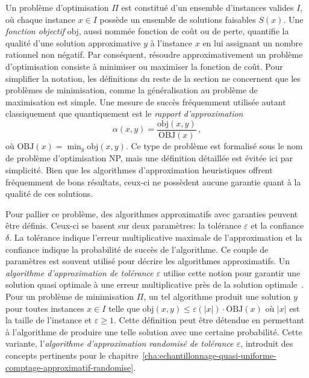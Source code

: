 Un problème d'optimisation $\Pi$ est constitué d'un ensemble d'instances valides $I$, où chaque instance $x \in I$ possède un ensemble de solutions faisables $S(x)$. Une \textit{fonction objectif} $\text{obj}$, aussi nommée fonction de coût ou de perte, quantifie la qualité d'une solution approximative $y$ à l'instance $x$ en lui assignant un nombre rationnel non négatif. Par conséquent, résoudre approximativement un problème d'optimisation consiste à minimiser ou maximiser la fonction de coût. Pour simplifier la notation, les définitions du reste de la section ne concernent que les problèmes de minimisation, comme la généralisation au problème de maximisation est simple. Une mesure de succès fréquemment utilisée autant classiquement que quantiquement est le \textit{rapport d'approximation}
\begin{equation}
    \alpha(x, y) = \frac{\text{obj}(x, y)}{\text{OBJ}(x)} \,,
\end{equation}
où $\text{OBJ}(x) = \min_{y} \text{obj} (x, y)$. Ce type de problème est formalisé sous le nom de problème d'optimisation \textsf{NP}, mais une définition détaillée est évitée ici par simplicité. Bien que les algorithmes d'approximation heuristiques offrent fréquemment de bons résultats, ceux-ci ne possèdent aucune garantie quant à la qualité de ces solutions.

Pour pallier ce problème, des algorithmes approximatifs avec garanties peuvent être définis. Ceux-ci se basent sur deux paramètres: la tolérance $\varepsilon$ et la confiance $\delta$. La tolérance indique l'erreur multiplicative maximale de l'approximation et la confiance indique la probabilité de succès de l'algorithme. Ce couple de paramètres est souvent utilisé pour décrire les algorithmes approximatifs. Un \textit{algorithme d'approximation de tolérance $\varepsilon$} utilise cette notion pour garantir une solution quasi optimale à une erreur multiplicative près de la solution optimale~\cite{vaziraniApproximationAlgorithms2003}. Pour un problème de minimisation $\Pi$, un tel algorithme produit une solution $y$ pour toutes instances $x \in I$ telle que $\text{obj}(x, y) \leq \varepsilon(\lvert x \rvert ) \cdot \text{OBJ}(x)$ où $\lvert  x \rvert $ est la taille de l'instance et $\varepsilon \geq 1   $. Cette définition peut être détendue en permettant à l'algorithme de produire une telle solution avec une certaine probabilité. Cette variante, l'\textit{algorithme d'approximation randomisé de tolérance $\varepsilon$}, introduit des concepts pertinents pour le chapitre~\ref{cha:echantillonnage-quasi-uniforme-comptage-approximatif-randomise}.

